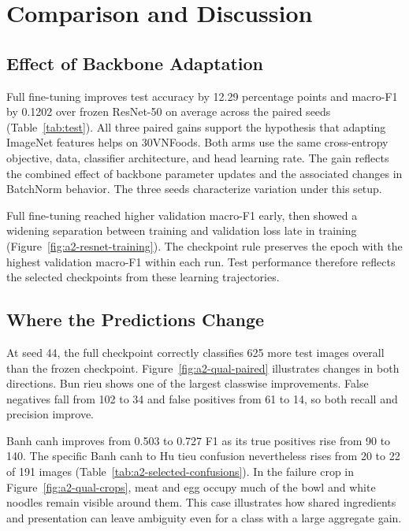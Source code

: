 \section{Comparison and Discussion}
\label{sec:a2-comparison-discussion}

\subsection{Effect of Backbone Adaptation}

Full fine-tuning improves test accuracy by 12.29 percentage points and macro-F1 by 0.1202 over frozen ResNet-50 on average across the paired seeds (Table~\ref{tab:test}). All three paired gains support the hypothesis that adapting ImageNet features helps on 30VNFoods. Both arms use the same cross-entropy objective, data, classifier architecture, and head learning rate. The gain reflects the combined effect of backbone parameter updates and the associated changes in BatchNorm behavior. The three seeds characterize variation under this setup.

Full fine-tuning reached higher validation macro-F1 early, then showed a widening separation between training and validation loss late in training (Figure~\ref{fig:a2-resnet-training}). The checkpoint rule preserves the epoch with the highest validation macro-F1 within each run. Test performance therefore reflects the selected checkpoints from these learning trajectories.

\subsection{Where the Predictions Change}

At seed 44, the full checkpoint correctly classifies 625 more test images overall than the frozen checkpoint. Figure~\ref{fig:a2-qual-paired} illustrates changes in both directions. Bun rieu shows one of the largest classwise improvements. False negatives fall from 102 to 34 and false positives from 61 to 14, so both recall and precision improve.

Banh canh improves from 0.503 to 0.727 F1 as its true positives rise from 90 to 140. The specific Banh canh to Hu tieu confusion nevertheless rises from 20 to 22 of 191 images (Table~\ref{tab:a2-selected-confusions}). In the failure crop in Figure~\ref{fig:a2-qual-crops}, meat and egg occupy much of the bowl and white noodles remain visible around them. This case illustrates how shared ingredients and presentation can leave ambiguity even for a class with a large aggregate gain.

